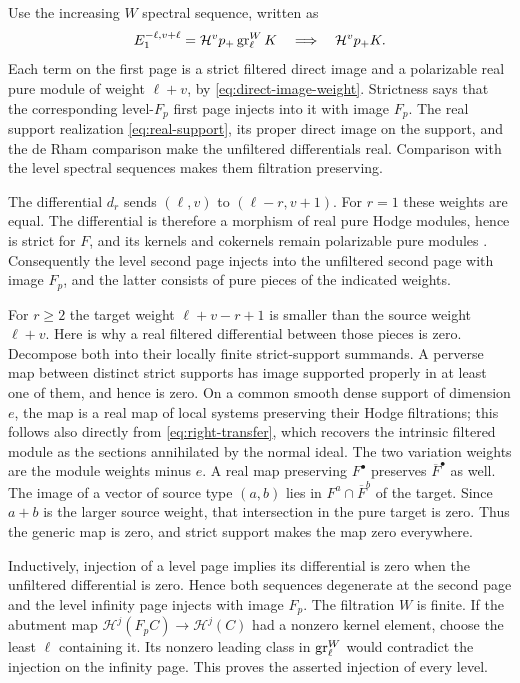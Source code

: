 Use the increasing \(W\) spectral sequence, written as
\begin{equation}\label{eq:weight-spectral-sequence}
 E_1^{-\ell,v+\ell}=\mathcal H^v p_+\operatorname{gr}^W_\ell K
 \quad\Longrightarrow\quad \mathcal H^v p_+K.
\end{equation}
Each term on the first page is a strict filtered direct image and a
polarizable real pure module of weight \(\ell+v\), by
\eqref{eq:direct-image-weight}.  Strictness says that the corresponding
level-\(F_p\) first page injects into it with image \(F_p\).
The real support realization \eqref{eq:real-support}, its proper direct
image on the support, and the de Rham comparison make the unfiltered
differentials real.  Comparison with the level spectral sequences makes
them filtration preserving.

The differential \(d_r\) sends \((\ell,v)\) to
\((\ell-r,v+1)\).  For \(r=1\) these weights are equal.  The differential
is therefore a morphism of real pure Hodge modules, hence is strict for
\(F\), and its kernels and cokernels remain polarizable pure modules
\cite[Propositions~1.10 and~1.14]{Saito1990Kahler}.  Consequently the
level second page injects into the unfiltered second page with image
\(F_p\), and the latter consists of pure pieces of the indicated weights.

For \(r\geq2\) the target weight \(\ell+v-r+1\) is smaller than the
source weight \(\ell+v\).  Here is why a real filtered differential
between those pieces is zero.  Decompose both into their locally finite
strict-support summands.  A perverse map between distinct strict supports
has image supported properly in at least one of them, and hence is zero.
On a common smooth dense support of dimension \(e\), the map is a real
map of local systems preserving their Hodge filtrations; this follows
also directly from \eqref{eq:right-transfer}, which recovers the intrinsic
filtered module as the sections annihilated by the normal ideal.  The
two variation weights are the module weights minus \(e\).  A real map
preserving \(F^\bullet\) preserves \(\overline F^\bullet\) as well.
The image of a vector of source type \((a,b)\) lies in
\(F^a\cap\overline F^b\) of the target.  Since \(a+b\) is the larger
source weight, that intersection in the pure target is zero.  Thus the
generic map is zero, and strict support makes the map zero everywhere.

Inductively, injection of a level page implies its differential is zero
when the unfiltered differential is zero.  Hence both sequences
degenerate at the second page and the level infinity page injects with
image \(F_p\).  The filtration \(W\) is finite.  If the abutment map
\(\mathcal H^j(F_pC)\to\mathcal H^j(C)\) had a nonzero kernel element,
choose the least \(\ell\) containing it.  Its nonzero leading class in
\(\operatorname{gr}^W_\ell\) would contradict the injection on the infinity page.
This proves the asserted injection of every level.

